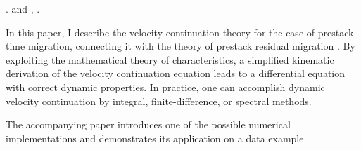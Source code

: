  \cite[]{me,SEG-1997-1762}.  \cite{hubral} and
\cite{GEO62-02-05890597}  \cite{adler} 
\cite[]{FBR08-06-02240234,GEO60-01-01420153}, 
 \cite[]{SEG-2001-11071110,second}. 

In this paper, I describe the velocity continuation theory for the case of
prestack time migration, connecting it with the theory of prestack residual
migration \cite[]{Al-Yahya.sep.50.219,Etgen.sepphd.68,GEO61-02-06050607}. By
exploiting the mathematical theory of characteristics, a simplified kinematic
derivation of the velocity continuation equation leads to a differential
equation with correct dynamic properties. 
In practice, one can
accomplish dynamic velocity continuation by integral, finite-difference, or
spectral methods.
\begin{comment}
For practical
applications, I chose the Fourier spectral method. The method has its
limitations \cite[]{Fomel.sep.97.sergey2}, but looks optimal in terms of
the accuracy versus efficiency trade-off.
 
Applying velocity continuation to migration velocity analysis involves
the following steps: 
\begin{enumerate}
\item prestack common-offset (and common-azimuth) migration - to
  generate the initial data for continuation,
\item velocity continuation with stacking across different offsets -
  to transform the offset data dimension into the velocity dimension,
\item picking the optimal velocity and slicing through the migrated
  data volume - to generate an optimally focused image.
\end{enumerate}
The final part of this paper includes a demonstration of all three
steps on a simple two-dimensional dataset.
\end{comment}
The accompanying paper \cite[]{second} introduces one of the possible
numerical implementations and demonstrates its application on a 
data example.

